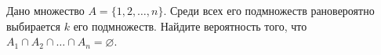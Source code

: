 \documentclass{article}
\begin{document}
Дано множество $A=\{1,2,\ldots,n\}$. Среди всех его подмножеств рановероятно выбирается $k$ его подмножеств. 
Найдите вероятность того, что $A_1 \cap A_2 \cap \ldots \cap A_n = \varnothing$.
\end{document}
